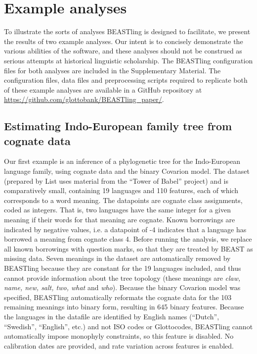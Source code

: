 \documentclass[twocolumn,10pt]{scrartcl}
\begin{document}
\section{Example analyses}

To illustrate the sorts of analyses BEASTling is designed to facilitate, we present the results of two example analyses.  Our intent is to concisely demonstrate the various abilities of the software, and these analyses should not be construed as serious attempts at historical linguistic scholarship.  The BEASTling configuration files for both analyses are included in the Supplementary Material.  The configuration files, data files and preprocessing scripts required to replicate both of these example analyses are available in a GitHub repository at \url{https://github.com/glottobank/BEASTling_paper/}.

\subsection{Estimating Indo-European family tree from cognate data}

Our first example is an inference of a phylogenetic tree for the Indo-European language family, using cognate data and the binary Covarion model.  The dataset\cite{List2014a} (prepared by List\cite{List2014} uses material from the ``Tower of Babel'' project\cite{Starostin2008}) and is comparatively small, containing 19 languages and 110 features, each of which corresponds to a word meaning.  The datapoints are cognate class assignments, coded as integers.  That is, two languages have the same integer for a given meaning if their words for that meaning are cognate.  Known borrowings are indicated by negative values, i.e. a datapoint of -4 indicates that a language has borrowed a meaning from cognate class 4.  Before running the analysis, we replace all known borrowings with question marks, so that they are treated by BEAST as missing data.  Seven meanings in the dataset are automatically removed by BEASTling because they are constant for the 19 languages included, and thus cannot provide information about the tree topology (these meanings are \emph{claw, name, new, salt, two, what} and \emph{who}).  Because the binary Covarion model was specified, BEASTling automatically reformats the cognate data for the 103 remaining meanings into binary form, resulting in 645 binary features.  Because the languages in the datafile are identified by English names (``Dutch'', ``Swedish'', ``English'', etc.) and not ISO codes or Glottocodes, BEASTling cannot automatically impose monophyly constraints, so this feature is disabled.  No calibration dates are provided, and rate variation across features is enabled.
\end{document}

